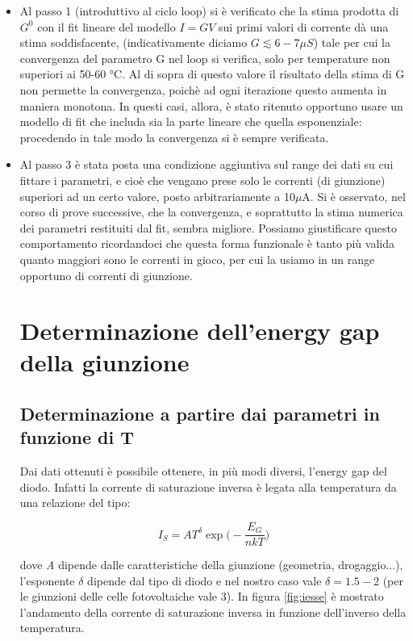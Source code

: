 \documentclass[a4paper]{article}
\begin{document}
\begin{itemize}

\item Al passo 1 (introduttivo al ciclo loop) si è verificato che la stima prodotta di $G^0$ con il fit lineare del modello $I = GV$ sui primi valori di corrente dà una stima soddisfacente, (indicativamente diciamo $G \lesssim 6-7 \mu S$) tale per cui la convergenza del parametro G nel loop si verifica, solo per temperature non superiori ai 50-60 °C. Al di sopra di questo valore il risultato della stima di G non permette la convergenza, poichè ad ogni iterazione questo aumenta in maniera monotona. In questi casi, allora, è stato ritenuto opportuno usare un modello di fit che includa sia la parte lineare che quella esponenziale: procedendo in tale modo la convergenza si è sempre verificata.


\item Al passo 3 è stata posta una condizione aggiuntiva sul range dei dati su cui fittare i parametri, e cioè che vengano prese solo le correnti (di giunzione) superiori ad un certo valore, posto arbitrariamente a 10$\mu$A. Si è osservato, nel corso di prove successive, che la convergenza, e soprattutto la stima numerica dei parametri restituiti dal fit, sembra migliore. Possiamo giustificare questo comportamento ricordandoci che questa forma funzionale è tanto più valida quanto maggiori sono le correnti in gioco, per cui la usiamo in un range opportuno di correnti di giunzione.\\

\section{Determinazione dell'energy gap della giunzione}
\subsection{Determinazione a partire dai parametri in funzione di T}

Dai dati ottenuti è possibile ottenere, in più modi diversi, l'energy gap del diodo. Infatti la corrente di saturazione inversa è legata alla temperatura da una relazione del tipo:

\begin{equation}
I_S = AT^{\delta} \exp \Big (-\frac{E_G}{nkT} \Big)
\label{eqn:schock}
\end{equation}

dove \emph{A} dipende dalle caratteristiche della giunzione (geometria, drogaggio...), l'esponente $\delta$ dipende dal tipo di diodo e nel nostro caso vale $\delta = 1.5 - 2$ (per le giunzioni delle celle fotovoltaiche vale 3). In figura \ref{fig:iesse} è mostrato l'andamento della corrente di saturazione inversa in funzione dell'inverso della temperatura.


\end{itemize}
\end{document}
